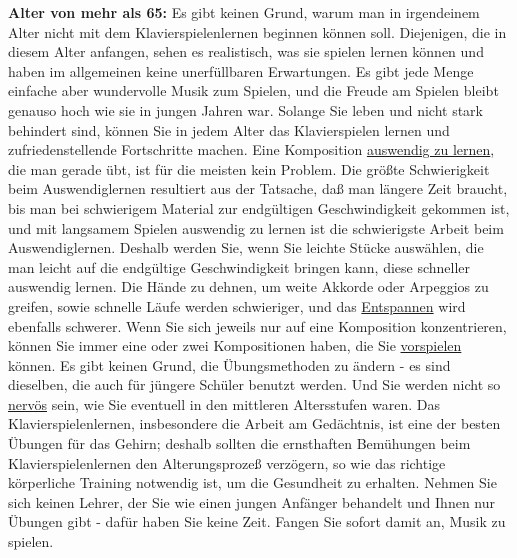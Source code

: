 \label{c1iii18c65}

\textbf{Alter von mehr als 65:}
Es gibt keinen Grund, warum man in irgendeinem Alter nicht mit dem Klavierspielenlernen beginnen können soll.
Diejenigen, die in diesem Alter anfangen, sehen es realistisch, was sie spielen lernen können und haben im allgemeinen keine unerfüllbaren Erwartungen.
Es gibt jede Menge einfache aber wundervolle Musik zum Spielen, und die Freude am Spielen bleibt genauso hoch wie sie in jungen Jahren war.
Solange Sie leben und nicht stark behindert sind, können Sie in jedem Alter das Klavierspielen lernen und zufriedenstellende Fortschritte machen.
Eine Komposition \hyperref[c1iii6]{auswendig zu lernen}, die man gerade übt, ist für die meisten kein Problem.
Die größte Schwierigkeit beim Auswendiglernen resultiert aus der Tatsache, daß man längere Zeit braucht, bis man bei schwierigem Material zur endgültigen Geschwindigkeit gekommen ist, und mit langsamem Spielen auswendig zu lernen ist die schwierigste Arbeit beim Auswendiglernen.
Deshalb werden Sie, wenn Sie leichte Stücke auswählen, die man leicht auf die endgültige Geschwindigkeit bringen kann, diese schneller auswendig lernen.
Die Hände zu dehnen, um weite Akkorde oder Arpeggios zu greifen, sowie schnelle Läufe werden schwieriger, und das \hyperref[c1ii14]{Entspannen} wird ebenfalls schwerer.
Wenn Sie sich jeweils nur auf eine Komposition konzentrieren, können Sie immer eine oder zwei Kompositionen haben, die Sie \hyperref[c1iii14]{vorspielen} können.
Es gibt keinen Grund, die Übungsmethoden zu ändern - es sind dieselben, die auch für jüngere Schüler benutzt werden.
Und Sie werden nicht so \hyperref[c1iii15]{nervös} sein, wie Sie eventuell in den mittleren Altersstufen waren.
Das Klavierspielenlernen, insbesondere die Arbeit am Gedächtnis, ist eine der besten Übungen für das Gehirn; deshalb sollten die ernsthaften Bemühungen beim Klavierspielenlernen den Alterungsprozeß verzögern, so wie das richtige körperliche Training notwendig ist, um die Gesundheit zu erhalten.
Nehmen Sie sich keinen Lehrer, der Sie wie einen jungen Anfänger behandelt und Ihnen nur Übungen gibt - dafür haben Sie keine Zeit.
Fangen Sie sofort damit an, Musik zu spielen.



